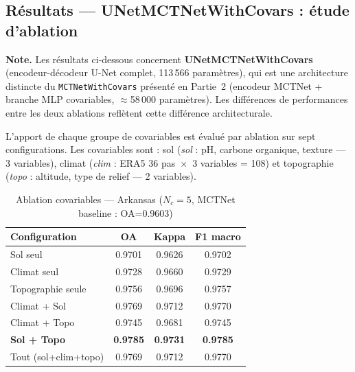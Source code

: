 
\subsection{Résultats — UNetMCTNetWithCovars : étude d'ablation}
\label{subsec:ablation_covars}

\noindent\textbf{Note.} Les résultats ci-dessous concernent \textbf{UNetMCTNetWithCovars}
(encodeur-décodeur U-Net complet, 113\,566 paramètres), qui est une architecture
distincte du \texttt{MCTNetWithCovars} présenté en Partie~2 (encodeur MCTNet +
branche MLP covariables, $\approx$58\,000 paramètres). Les différences de
performances entre les deux ablations reflètent cette différence architecturale.

\medskip
L'apport de chaque groupe de covariables est évalué par ablation sur sept
configurations. Les covariables sont : sol (\textit{sol} : pH, carbone
organique, texture — 3 variables), climat (\textit{clim} : ERA5 36
pas~$\times$~3 variables = 108) et topographie (\textit{topo} : altitude,
type de relief — 2 variables).

\begin{table}[H]
\centering
\caption{Ablation covariables — Arkansas ($N_c=5$, MCTNet baseline : OA=0.9603)}
\label{tab:ablation_arkansas}
\begin{tabular}{lccc}
\toprule
\textbf{Configuration} & \textbf{OA} & \textbf{Kappa} & \textbf{F1 macro} \\
\midrule
Sol seul             & 0.9701 & 0.9626 & 0.9702 \\
Climat seul          & 0.9728 & 0.9660 & 0.9729 \\
Topographie seule    & 0.9756 & 0.9696 & 0.9757 \\
Climat + Sol         & 0.9769 & 0.9712 & 0.9770 \\
Climat + Topo        & 0.9745 & 0.9681 & 0.9745 \\
\textbf{Sol + Topo}  & \textbf{0.9785} & \textbf{0.9731} & \textbf{0.9785} \\
Tout (sol+clim+topo) & 0.9769 & 0.9712 & 0.9770 \\
\bottomrule
\end{tabular}
\end{table}

